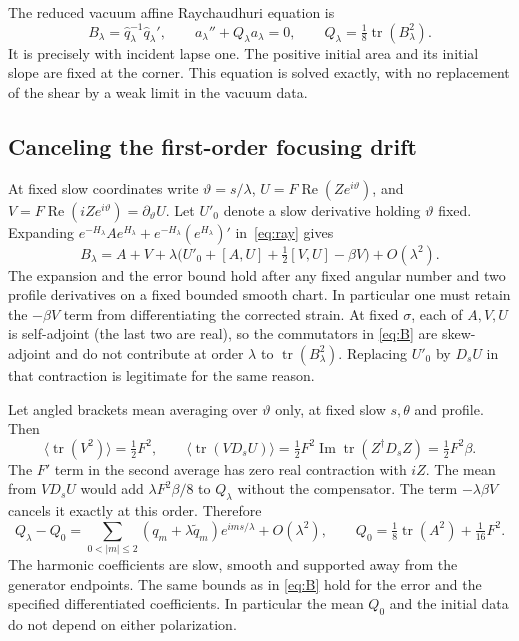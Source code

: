 \documentclass[11pt]{article}
\newcommand{\tr}{\operatorname{tr}}
\newcommand{\re}{\operatorname{Re}}
\newcommand{\im}{\operatorname{Im}}
\begin{document}
The reduced vacuum affine Raychaudhuri equation is
\begin{equation}
 B_\lambda=\widehat q_\lambda^{-1}\widehat q_\lambda',
 \qquad
 a_\lambda''+Q_\lambda a_\lambda=0,\qquad
 Q_\lambda=\tfrac18\tr(B_\lambda^2).
 \label{eq:ray}
\end{equation}
It is precisely \cite[Eqs.~(3.1)--(3.2)]{LR} with incident
lapse one. The positive initial area and its initial slope
are fixed at the corner. This equation is solved
exactly, with no replacement of the shear by a weak
limit in the vacuum data.

\subsection{Canceling the first-order focusing drift}

At fixed slow coordinates write \(\vartheta=s/\lambda\),
\(U=F\re(Ze^{i\vartheta})\), and
\(V=F\re(iZe^{i\vartheta})=\partial_\vartheta U\).
Let \(U'_0\) denote a slow derivative holding
\(\vartheta\) fixed.
Expanding
\(e^{-H_\lambda}A e^{H_\lambda}
 +e^{-H_\lambda}(e^{H_\lambda})'\)
in~\eqref{eq:ray} gives
\begin{equation}
 B_\lambda=A+V+
   \lambda\bigl(U'_0+[A,U]+\tfrac12[V,U]-\beta V\bigr)
   +O(\lambda^2).
 \label{eq:B}
\end{equation}
The expansion and the error bound hold after any fixed
angular number and two profile derivatives on a fixed
bounded smooth chart. In particular one must retain the
\(-\beta V\) term from differentiating the corrected
strain. At fixed \(\sigma\), each of \(A,V,U\) is
self-adjoint (the last two are real), so the commutators
in \eqref{eq:B} are skew-adjoint and do not contribute
at order \(\lambda\) to \(\tr(B_\lambda^2)\). Replacing
\(U'_0\) by \(D_s U\) in that contraction is legitimate
for the same reason.

Let angled brackets mean averaging over \(\vartheta\)
only, at fixed slow \(s,\theta\) and profile. Then
\[
 \langle \tr(V^2)\rangle=\tfrac12 F^2,\qquad
 \langle\tr(V D_sU)\rangle
  =\tfrac12 F^2\im\tr(Z^\dagger D_s Z)
  =\tfrac12F^2\beta .
\]
The \(F'\) term in the second average has zero real
contraction with \(iZ\). The mean from \(V D_sU\)
would add \(\lambda F^2\beta/8\) to \(Q_\lambda\)
without the compensator. The term \(-\lambda\beta V\)
cancels it exactly at this order. Therefore
\begin{equation}
 Q_\lambda-Q_0
 =\sum_{0<|m|\leq 2} (q_m+\lambda\widetilde q_m)
                         e^{ims/\lambda}+O(\lambda^2),
 \qquad Q_0=\tfrac18\tr(A^2)+\tfrac1{16}F^2 .
 \label{eq:average}
\end{equation}
The harmonic coefficients are slow, smooth and supported
away from the generator endpoints. The same bounds as in
\eqref{eq:B} hold for the error and the specified
differentiated coefficients. In particular the mean
\(Q_0\) and the initial data do not depend on either
polarization.
\end{document}
